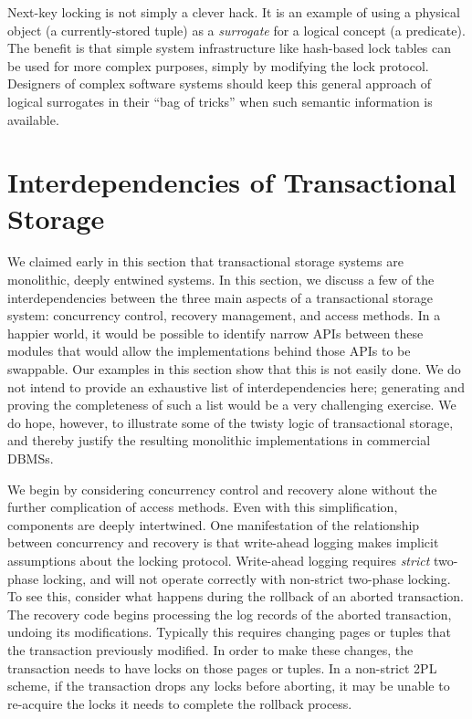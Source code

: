 \documentclass[a4paper,11pt,twoside,openright]{book}
\begin{document}
Next-key locking is not simply a clever hack. It is an example of using
a physical object (a currently-stored tuple) as a \emph{surrogate} for a
logical concept (a predicate). The benefit is that simple system
infrastructure like hash-based lock tables can be used for more complex
purposes, simply by modifying the lock protocol. Designers of complex
software systems should keep this general approach of logical surrogates
in their ``bag of tricks'' when such semantic information is available.

\hypertarget{interdependencies-of-transactional-storage}{%
\section{Interdependencies of Transactional
Storage}\label{interdependencies-of-transactional-storage}}

We claimed early in this section that transactional storage systems are
monolithic, deeply entwined systems. In this section, we discuss a few
of the interdependencies between the three main aspects of a
transactional storage system: concurrency control, recovery management,
and access methods. In a happier world, it would be possible to identify
narrow APIs between these modules that would allow the implementations
behind those APIs to be swappable. Our examples in this section show
that this is not easily done. We do not intend to provide an exhaustive
list of interdependencies here; generating and proving the completeness
of such a list would be a very challenging exercise. We do hope,
however, to illustrate some of the twisty logic of transactional
storage, and thereby justify the resulting monolithic implementations in
commercial DBMSs.

We begin by considering concurrency control and recovery alone without
the further complication of access methods. Even with this
simplification, components are deeply intertwined. One manifestation of
the relationship between concurrency and recovery is that write-ahead
logging makes implicit assumptions about the locking protocol.
Write-ahead logging requires \emph{strict} two-phase locking, and will
not operate correctly with non-strict two-phase locking. To see this,
consider what happens during the rollback of an aborted transaction.
The recovery code begins processing the log records of the aborted
transaction, undoing its modifications. Typically this requires changing
pages or tuples that the transaction previously modified. In order to
make these changes, the transaction needs to have locks on those pages
or tuples. In a non-strict 2PL scheme, if the transaction drops any
locks before aborting, it may be unable to re-acquire the locks it needs
to complete the rollback process.
\end{document}

